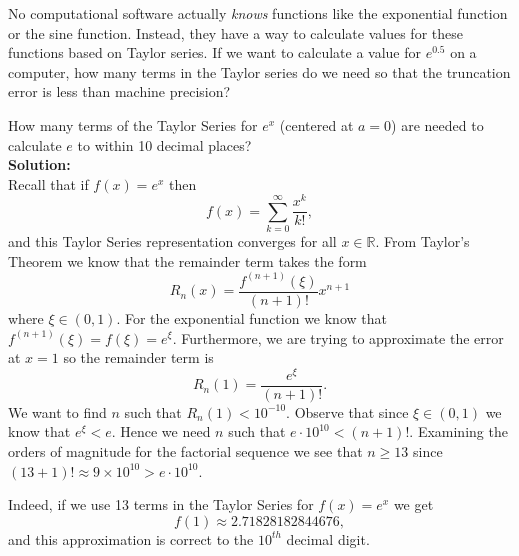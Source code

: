 \begin{problem}
    No computational software actually {\it knows} functions like the exponential function
    or the sine function.  Instead, they have a way to calculate values for these
    functions based on Taylor series.  
    If we want to calculate a value for $e^{0.5}$ on a computer, how many terms in the
    Taylor series do we need so that the truncation error is less than machine precision?
\end{problem}

\begin{example}
    How many terms of the Taylor Series for $e^x$ (centered at $a=0$) are needed to
    calculate $e$ to within 10 decimal places? \\{\bf Solution:} \\
    Recall that if $f(x) = e^x$ then 
    \[ f(x) = \sum_{k=0}^\infty \frac{x^k}{k!}, \]
    and this Taylor Series representation converges for all $x \in \mathbb{R}$.  From
    Taylor's Theorem we know that the remainder term takes the form 
    \[ R_n(x) = \frac{f^{(n+1)}(\xi)}{(n+1)!} x^{n+1} \]
    where $\xi \in (0,1)$. For the exponential function we know that $f^{(n+1)}(\xi) =
    f(\xi) = e^\xi$.  Furthermore, we are trying to approximate the error at $x=1$ so the
    remainder term is 
    \[ R_n(1) = \frac{e^\xi}{(n+1)!}. \]
    We want to find $n$ such that $R_n(1) < 10^{-10}$.  Observe that since $\xi \in (0,1)$
    we know that $e^\xi < e$.  Hence we need $n$ such that $e \cdot 10^{10} < (n+1)!$.
    Examining the orders of magnitude for the factorial sequence we see that $n \ge
    13$ since $(13+1)! \approx 9 \times 10^{10} > e \cdot 10^{10}$.

    Indeed, if we use 13 terms in the Taylor Series for $f(x) = e^x$ we get
    \[ f(1) \approx 2.71828182844676, \]
    and this approximation is correct to the $10^{th}$ decimal digit.
\end{example}

